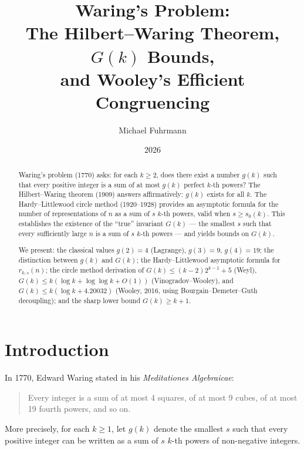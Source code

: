 \documentclass[12pt,a4paper]{amsart}
\theoremstyle{definition}
\begin{document}
\title{Waring's Problem:\\
       The Hilbert--Waring Theorem, $G(k)$ Bounds,\\
       and Wooley's Efficient Congruencing}

\author{Michael Fuhrmann}
\address{Specialist Mathematics Project, Build 80}
\date{2026}

\begin{abstract}
Waring's problem (1770) asks: for each $k \geq 2$, does there exist a number
$g(k)$ such that every positive integer is a sum of at most $g(k)$ perfect
$k$-th powers?  The Hilbert--Waring theorem (1909) answers affirmatively:
$g(k)$ exists for all $k$.  The Hardy--Littlewood circle method (1920--1928)
provides an asymptotic formula for the number of representations of $n$ as
a sum of $s$ $k$-th powers, valid when $s \geq s_0(k)$.  This establishes
the existence of the ``true'' invariant $G(k)$ --- the smallest $s$ such
that every sufficiently large $n$ is a sum of $s$ $k$-th powers --- and yields
bounds on $G(k)$.

We present:  the classical values $g(2) = 4$ (Lagrange), $g(3) = 9$,
$g(4) = 19$; the distinction between $g(k)$ and $G(k)$; the Hardy--Littlewood
asymptotic formula for $r_{k,s}(n)$; the circle method derivation of
$G(k) \leq (k-2)2^{k-1} + 5$ (Weyl), $G(k) \leq k(\log k + \log\log k + O(1))$
(Vinogradov--Wooley), and $G(k) \leq k(\log k + 4.20032)$ (Wooley, 2016, using
Bourgain--Demeter--Guth decoupling); and the sharp lower bound $G(k) \geq k + 1$.
\end{abstract}

\maketitle
\tableofcontents

\section{Introduction}

In 1770, Edward Waring stated in his \emph{Meditationes Algebraicae}:
\begin{quote}
  Every integer is a sum of at most 4 squares, of at most 9 cubes, of
  at most 19 fourth powers, and so on.
\end{quote}
More precisely, for each $k \geq 1$, let $g(k)$ denote the smallest $s$
such that every positive integer can be written as a sum of $s$ $k$-th
powers of non-negative integers.
\end{document}
